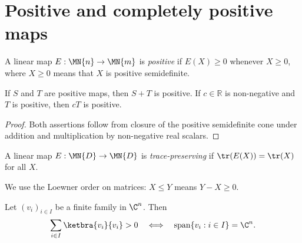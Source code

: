 \section{Positive and completely positive maps}

\begin{definition}\label{def:positive_map}
    \leanok
    A linear map $E : \MN{n} \to \MN{m}$ is \emph{positive}
    if $E(X) \ge 0$ whenever $X \ge 0$, where $X \ge 0$
    means that $X$ is positive semidefinite.
\end{definition}

\begin{lemma}
    \label{lem:positive_map_add_nonnegative_smul}
    \leanok
    If $S$ and $T$ are positive maps, then $S+T$ is positive. If
    $c\in\mathbb R$ is non-negative and $T$ is positive, then $cT$ is
    positive.
\end{lemma}

\begin{proof}
    \leanok
    Both assertions follow from closure of the positive semidefinite cone
    under addition and multiplication by non-negative real scalars.
\end{proof}

\begin{definition}\label{def:trace_preserving}
    \leanok
    A linear map $E : \MN{D} \to \MN{D}$ is \emph{trace-preserving}
    if $\tr(E(X)) = \tr(X)$ for all $X$.
\end{definition}

\begin{remark}\leanok
    We use the Loewner order on matrices: $X \le Y$ means
    $Y - X \ge 0$.
\end{remark}

\begin{theorem}
    \label{thm:finite_frame_posdef}
    \leanok
    Let $(v_i)_{i\in I}$ be a finite family in $\C^n$. Then
    \begin{align}
        \sum_{i\in I}\ketbra{v_i}{v_i}>0
        \quad\Longleftrightarrow\quad
        \operatorname{span}\{v_i:i\in I\}=\C^n.
        \notag
    \end{align}
\end{theorem}

